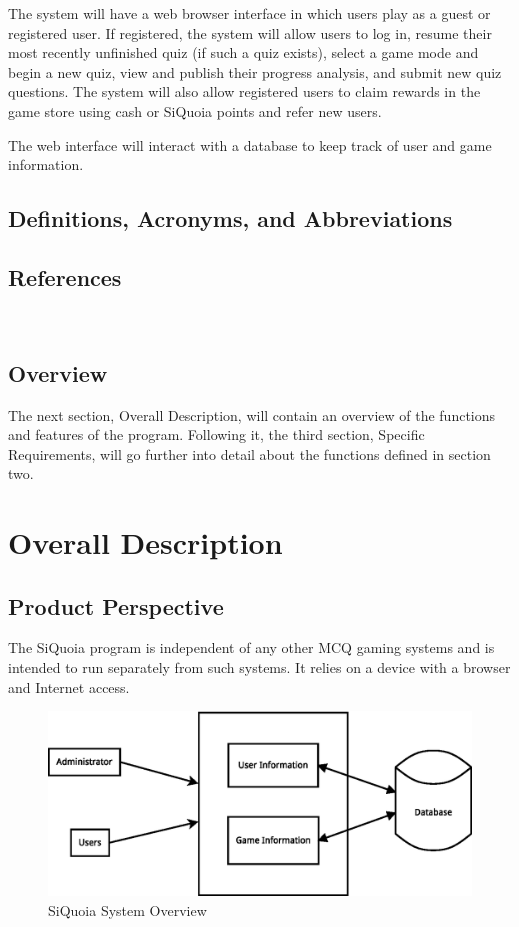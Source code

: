 \documentclass[12pt]{paper}
\begin{document}
The system will have a web browser interface in which \glspl{user}
play as a guest or registered user. If registered, the system will
allow users to log in, resume their most recently unfinished quiz (if
such a quiz exists), select a game mode and begin a new quiz, view and
publish their progress analysis, and submit new quiz questions. The
system will also allow registered users to claim rewards in the game
store using cash or SiQuoia points and refer new users.

The web interface will interact with a database to keep track of user
and game information.

\subsection{Definitions, Acronyms, and Abbreviations}
\label{subsec:gls}
\printglossaries

\subsection{References}~\\[-9em]
\label{subsec:refs}


\subsection{Overview}
\label{subsec:overview}
The next section, Overall Description, will contain an overview of the
functions and features of the program. Following it, the third
section, Specific Requirements, will go further into detail about the
functions defined in section two.

\section{Overall Description}
\label{sec:overall}
\subsection{Product Perspective}
\label{subsec:perspective}
The SiQuoia program is independent of any other \gls{MCQ} gaming
systems and is intended to run separately from such systems. It relies
on a device with a browser and Internet access.

\begin{figure}[h!]
\centering
\includegraphics[width=\textwidth]{system-overview}
\caption{SiQuoia System Overview}
\end{figure}
\end{document}
